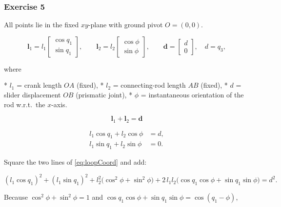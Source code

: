 \documentclass[12pt,a4paper]{article}
\begin{document}
\newpage

\subsubsection*{Exercise 5}



All points lie in the fixed \(xy\)-plane with ground pivot \(O=(0,0)\).

\[
\mathbf l_{1}
   = l_{1}
     \begin{bmatrix}
       \cos q_{1}\\[2pt]
       \sin q_{1}
     \end{bmatrix},
\qquad
\mathbf l_{2}
   = l_{2}
     \begin{bmatrix}
       \cos\phi\\[2pt]
       \sin\phi
     \end{bmatrix},
\qquad
\mathbf d
   =
     \begin{bmatrix}
       d\\[2pt] 0
     \end{bmatrix},
\quad
d=q_{3},
\]

where  

* \(l_{1}\) = crank length \(OA\) (fixed),  
* \(l_{2}\) = connecting-rod length \(AB\) (fixed),  
* \(d\)     = slider displacement \(OB\) (prismatic joint),  
* \(\phi\)  = instantaneous orientation of the rod w.r.t.\ the \(x\)-axis.  

\bigskip


\[
\;\mathbf l_{1} + \mathbf l_{2} = \mathbf d\;
\]


\label{eq:loopCoord}
\[
\begin{aligned}
l_{1}\cos q_{1} + l_{2}\cos\phi &= d, \\[2pt]
l_{1}\sin q_{1} + l_{2}\sin\phi &= 0.
\end{aligned}\tag{1}
\]


Square the two lines of \eqref{eq:loopCoord} and add:

\[
(l_{1}\cos q_{1})^{2} + (l_{1}\sin q_{1})^{2}
  + l_{2}^{2}\!\bigl(\cos^{2}\phi + \sin^{2}\phi\bigr)
  + 2\,l_{1}l_{2}\bigl(\cos q_{1}\cos\phi + \sin q_{1}\sin\phi\bigr)
  = d^{2}.
\]

Because \(\cos^{2}\phi+\sin^{2}\phi = 1\) and  
\(\cos q_{1}\cos\phi + \sin q_{1}\sin\phi = \cos(q_{1}-\phi)\),
\end{document}
